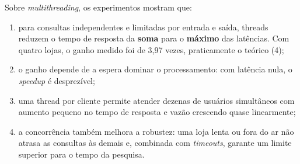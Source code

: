Sobre \textit{multithreading}, os experimentos mostram que:

\begin{enumerate}
  \item para consultas independentes e limitadas por entrada e saída, threads reduzem o tempo de resposta da \textbf{soma} para o \textbf{máximo} das latências. Com quatro lojas, o ganho medido foi de 3,97 vezes, praticamente o teórico (4);
  \item o ganho depende de a espera dominar o processamento: com latência nula, o \textit{speedup} é desprezível;
  \item uma thread por cliente permite atender dezenas de usuários simultâneos com aumento pequeno no tempo de resposta e vazão crescendo quase linearmente;
  \item a concorrência também melhora a robustez: uma loja lenta ou fora do ar não atrasa as consultas às demais e, combinada com \textit{timeouts}, garante um limite superior para o tempo da pesquisa.
\end{enumerate}

\postextual


